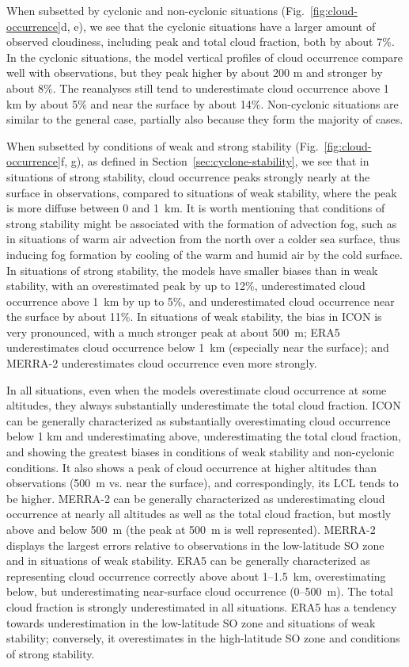 \documentclass[draft]{agujournal2019}
\begin{document}
When subsetted by cyclonic and non-cyclonic situations (Fig.~\ref{fig:cloud-occurrence}d, e), we see that the cyclonic situations have a larger amount of observed cloudiness, including peak and total cloud fraction, both by about 7\%. In the cyclonic situations, the model vertical profiles of cloud occurrence compare well with observations, but they peak higher by about 200 m and stronger by about 8\%. The reanalyses still tend to underestimate cloud occurrence above 1 km by about 5\% and near the surface by about 14\%. Non-cyclonic situations are similar to the general case, partially also because they form the majority of cases.

When subsetted by conditions of weak and strong stability (Fig.~\ref{fig:cloud-occurrence}f, g), as defined in Section~\ref{sec:cyclone-stability}, we see that in situations of strong stability, cloud occurrence peaks strongly nearly at the surface in observations, compared to situations of weak stability, where the peak is more diffuse between 0 and 1~km. It is worth mentioning that conditions of strong stability might be associated with the formation of advection fog, such as in situations of warm air advection from the north over a colder sea surface, thus inducing fog formation by cooling of the warm and humid air by the cold surface. In situations of strong stability, the models have smaller biases than in weak stability, with an overestimated peak by up to 12\%, underestimated cloud occurrence above 1~km by up to 5\%, and underestimated cloud occurrence near the surface by about 11\%. In situations of weak stability, the bias in ICON is very pronounced, with a much stronger peak at about 500~m; ERA5 underestimates cloud occurrence below 1~km (especially near the surface); and MERRA-2 underestimates cloud occurrence even more strongly.

In all situations, even when the models overestimate cloud occurrence at some altitudes, they always substantially underestimate the total cloud fraction. ICON can be generally characterized as substantially overestimating cloud occurrence below 1 km and underestimating above, underestimating the total cloud fraction, and showing the greatest biases in conditions of weak stability and non-cyclonic conditions. It also shows a peak of cloud occurrence at higher altitudes than observations (500~m vs. near the surface), and correspondingly, its LCL tends to be higher. MERRA-2 can be generally characterized as underestimating cloud occurrence at nearly all altitudes as well as the total cloud fraction, but mostly above and below 500~m (the peak at 500~m is well represented). MERRA-2 displays the largest errors relative to observations in the low-latitude SO zone and in situations of weak stability. ERA5 can be generally characterized as representing cloud occurrence correctly above about 1--1.5~km, overestimating below, but underestimating near-surface cloud occurrence (0--500~m). The total cloud fraction is strongly underestimated in all situations. ERA5 has a tendency towards underestimation in the low-latitude SO zone and situations of weak stability; conversely, it overestimates in the high-latitude SO zone and conditions of strong stability.
\end{document}
